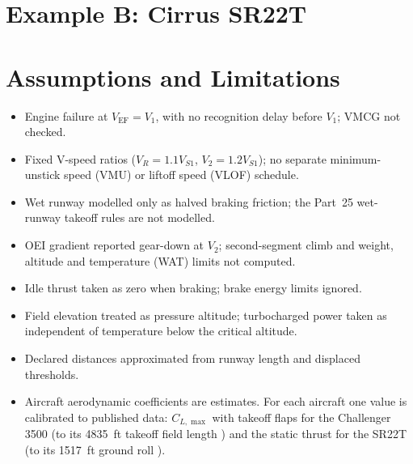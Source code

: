 \documentclass[11pt,letterpaper]{article}
\numberwithin{equation}{section}
\begin{document}
\clearpage
\section{Example B: Cirrus SR22T}\label{sec:exB}


\section{Assumptions and Limitations}
\begin{itemize}
\item Engine failure at $V_\text{EF} = V_1$, with no recognition delay before $V_1$; VMCG not checked.
\item Fixed V-speed ratios ($V_R = 1.1V_{S1}$, $V_2 = 1.2V_{S1}$); no separate minimum-unstick speed (VMU) or liftoff speed (VLOF) schedule.
\item Wet runway modelled only as halved braking friction; the Part~25 wet-runway takeoff rules are not modelled.
\item OEI gradient reported gear-down at $V_2$; second-segment climb and weight, altitude and temperature (WAT) limits not computed.
\item Idle thrust taken as zero when braking; brake energy limits ignored.
\item Field elevation treated as pressure altitude; turbocharged power taken as independent of temperature below the critical altitude.
\item Declared distances approximated from runway length and displaced thresholds.
\item Aircraft aerodynamic coefficients are estimates. For each aircraft one value is calibrated to published data: $C_{L,\max}$ with takeoff flaps for the Challenger 3500 (to its \SI{4835}{ft} takeoff field length \cite{BBD-CL3500}) and the static thrust for the SR22T (to its \SI{1517}{ft} ground roll \cite{AOPA}).
\end{itemize}
\end{document}
